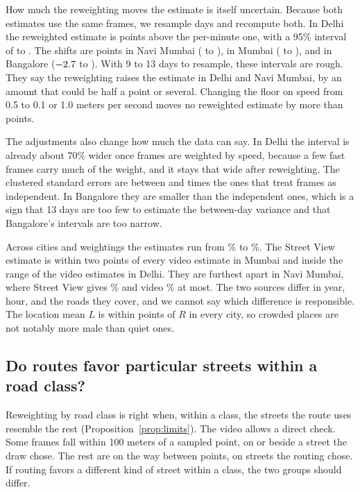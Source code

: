 \documentclass[11pt]{article}
\begin{document}
How much the reweighting moves the estimate is itself uncertain. Because both estimates use the same frames, we resample days and recompute both. In Delhi the reweighted estimate is \shiftDelhi{} points above the per-minute one, with a 95\% interval of \shiftlowDelhi{} to \shifthighDelhi. The shifts are \shiftNaviMumbai{} points in Navi Mumbai (\shiftlowNaviMumbai{} to \shifthighNaviMumbai), \shiftMumbai{} in Mumbai (\shiftlowMumbai{} to \shifthighMumbai), and \shiftBangalore{} in Bangalore ($-2.7$ to \shifthighBangalore). With 9 to 13 days to resample, these intervals are rough. They say the reweighting raises the estimate in Delhi and Navi Mumbai, by an amount that could be half a point or several. Changing the floor on speed from 0.5 to 0.1 or 1.0 meters per second moves no reweighted estimate by more than \floorgapmax{} points.

The adjustments also change how much the data can say. In Delhi the interval is already about 70\% wider once frames are weighted by speed, because a few fast frames carry much of the weight, and it stays that wide after reweighting. The clustered standard errors are between \videoseratiomin{} and \videoseratiomax{} times the ones that treat frames as independent. In Bangalore they are smaller than the independent ones, which is a sign that 13 days are too few to estimate the between-day variance and that Bangalore's intervals are too narrow.

Across cities and weightings the estimates run from \videoNaviMumbaipermeterofroute\% to \videoBangaloreroadnetwork\%. The Street View estimate is within two points of every video estimate in Mumbai and inside the range of the video estimates in Delhi. They are furthest apart in Navi Mumbai, where Street View gives \streetviewNaviMumbai\% and video \videoNaviMumbairoadnetwork\% at most. The two sources differ in year, hour, and the roads they cover, and we cannot say which difference is responsible. The location mean $L$ is within \locationgapmax{} points of $R$ in every city, so crowded places are not notably more male than quiet ones.

\subsection{Do routes favor particular streets within a road class?}

Reweighting by road class is right when, within a class, the streets the route uses resemble the rest (Proposition~\ref{prop:limits}). The video allows a direct check. Some frames fall within 100 meters of a sampled point, on or beside a street the draw chose. The rest are on the way between points, on streets the routing chose. If routing favors a different kind of street within a class, the two groups should differ.
\end{document}
